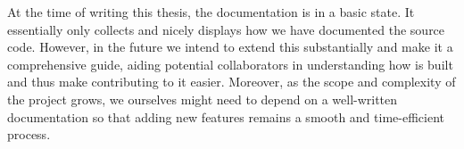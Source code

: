 \documentclass[\relativeRoot/main.tex]{subfiles}
\begin{document}
At the time of writing this thesis, the documentation is in a basic state. It essentially only collects and nicely displays how we have documented the source code. However, in the future we intend to extend this substantially and make it a comprehensive guide, aiding potential collaborators in understanding how \inlinelyproxlogo{} is built and thus make contributing to it easier. Moreover, as the scope and complexity of the project grows, we ourselves might need to depend on a well-written documentation so that adding new features remains a smooth and time-efficient process.
\end{document}
